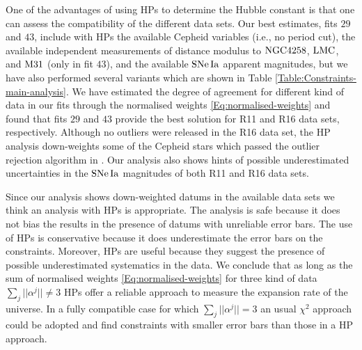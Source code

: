 One of the advantages of using HPs to determine the Hubble constant is that one can assess the compatibility of the different data sets. Our best estimates, fits $29$ and $43$, include with HPs the available Cepheid variables (i.e., no period cut), the available independent measurements of distance modulus to $\mathrm{NGC4258}$, $\mathrm{LMC}$, and $\mathrm{M31}$ (only in fit $43$), and the available $\mathrm{SNe\,Ia}$ apparent magnitudes, but we have also performed several variants which are shown in Table \ref{Table:Constraints-main-analysis}. %
We have estimated the degree of agreement for different kind of data in our fits through the normalised weights \eqref{Eq:normalised-weights} and found that fits $29$ and $43$ provide the best solution for R11 and R16 data sets, respectively. Although no outliers were released in the R16 data set, the HP analysis down-weights some of the Cepheid stars which passed the outlier rejection algorithm in \cite{Riess:2016jrr}. Our analysis also shows hints of possible underestimated uncertainties in the $\mathrm{SNe\,Ia}$ magnitudes of both R11 and R16 data sets.   

Since our analysis shows down-weighted datums in the available data sets we think an analysis with HPs is appropriate. The analysis is safe because it does not bias the results in the presence of datums with unreliable error bars. The use of HPs is conservative because it does underestimate the error bars on the constraints. Moreover, HPs are useful because they suggest the presence of possible underestimated systematics in the data. We conclude that as long as the sum of normalised weights \eqref{Eq:normalised-weights} for three kind of data $\sum_j || \alpha^j || \neq 3$  HPs offer a reliable approach to measure the expansion rate of the universe. In a fully compatible case for which $\sum_j || \alpha^j || = 3$ an usual $\chi^2$ approach could be adopted and find constraints with smaller error bars than those in a HP approach.  

